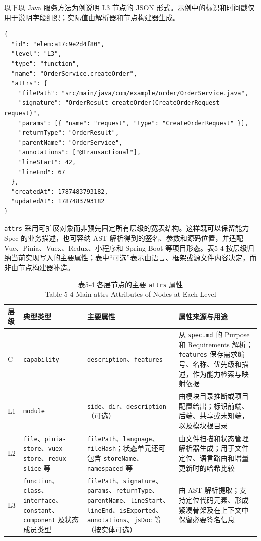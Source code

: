 以下以 Java 服务方法为例说明 L3 节点的 JSON 形式。示例中的标识和时间戳仅用于说明字段组织；实际值由解析器和节点构建器生成。

\begin{verbatim}
{
  "id": "elem:a17c9e2d4f80",
  "level": "L3",
  "type": "function",
  "name": "OrderService.createOrder",
  "attrs": {
    "filePath": "src/main/java/com/example/order/OrderService.java",
    "signature": "OrderResult createOrder(CreateOrderRequest request)",
    "params": [{ "name": "request", "type": "CreateOrderRequest" }],
    "returnType": "OrderResult",
    "parentName": "OrderService",
    "annotations": ["@Transactional"],
    "lineStart": 42,
    "lineEnd": 67
  },
  "createdAt": 1787483793182,
  "updatedAt": 1787483793182
}
\end{verbatim}

\texttt{attrs} 采用可扩展对象而非预先固定所有层级的宽表结构。这样既可以保留能力 Spec 的业务描述，也可容纳 AST 解析得到的签名、参数和源码位置，并适配 Vue、Pinia、Vuex、Redux、小程序和 Spring Boot 等项目形态。表5-4 按层级归纳当前实现写入的主要属性；表中“可选”表示由语言、框架或源文件内容决定，而非由节点构建器补造。

\begin{table}[htbp]
\centering
\small
\caption{表5-4 各层节点的主要 \texttt{attrs} 属性\\Table 5-4 Main attrs Attributes of Nodes at Each Level}
\begin{tabularx}{\textwidth}{|X|X|X|X|}
\hline
\textbf{层级} & \textbf{典型类型} & \textbf{主要属性} & \textbf{属性来源与用途} \\
\hline
C & \texttt{capability} & \texttt{description}、\texttt{features} & 从 \texttt{spec.md} 的 Purpose 和 Requirements 解析；\texttt{features} 保存需求编号、名称、优先级和描述，作为能力检索与映射依据 \\
L1 & \texttt{module} & \texttt{side}、\texttt{dir}、\texttt{description}（可选） & 由模块目录推断或项目配置给出；标识前端、后端、共享或未知端，以及模块根目录 \\
L2 & \texttt{file}、\texttt{pinia-store}、\texttt{vuex-store}、\texttt{redux-slice} 等 & \texttt{filePath}、\texttt{language}、\texttt{fileHash}；状态单元还可包含 \texttt{storeName}、\texttt{namespaced} 等 & 由文件扫描和状态管理解析器生成；用于文件定位、语言路由和增量更新时的哈希比较 \\
L3 & \texttt{function}、\texttt{class}、\texttt{interface}、\texttt{constant}、\texttt{component} 及状态成员类型 & \texttt{filePath}、\texttt{signature}、\texttt{params}、\texttt{returnType}、\texttt{parentName}、\texttt{lineStart}、\texttt{lineEnd}、\texttt{isExported}、\texttt{annotations}、\texttt{jsDoc} 等（按实体可选） & 由 AST 解析提取；支持定位代码元素、形成紧凑骨架及在上下文中保留必要签名信息 \\
\hline
\end{tabularx}
\end{table}

